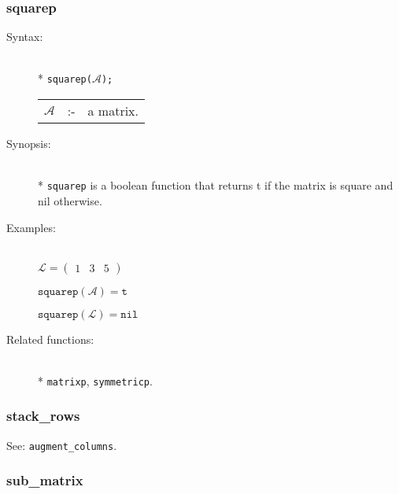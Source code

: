 \subsubsection{squarep}
\label{linalg:squarep}

\begin{description}
\item[Syntax:]\mbox{}\\*
\texttt{squarep($\mathcal{A}$);}\\[2mm]
\begin{tabular}{l l l}
$\mathcal{A}$ &:-& a matrix.
\end{tabular}

\item[Synopsis:]\mbox{}\\*
\texttt{squarep} is a boolean function that returns t if
                the matrix is square and nil otherwise.

\item[Examples:]\mbox{}\\
  \(\mathcal{L} = \begin{pmatrix} 1 & 3 & 5 \end{pmatrix}\)

  \(\texttt{squarep}(\mathcal{A}) = \texttt{t}\)

  \(\texttt{squarep}(\mathcal{L}) = \texttt{nil}\)

\item[Related functions:]\mbox{}\\*
\texttt{matrixp}, \texttt{symmetricp}.
\end{description}


\subsubsection{stack\_rows}
\label{linalg:stack_rows}

See: \texttt{augment\_columns}.


\subsubsection{sub\_matrix}
\label{linalg:sub_matrix}

